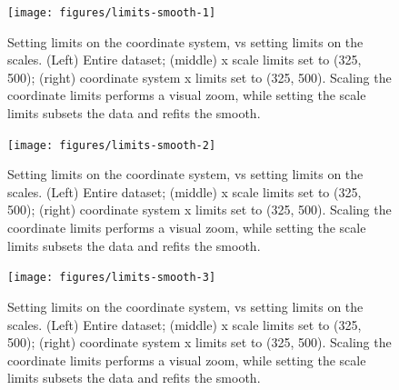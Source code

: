 \begin{figure}
\texttt{[image: figures/limits-smooth-1]} \caption{Setting limits on the coordinate system, vs setting limits on the scales.  (Left) Entire dataset; (middle) x scale limits set to (325, 500); (right) coordinate system x limits set to (325, 500).  Scaling the coordinate limits performs a visual zoom, while setting the scale limits subsets the data and refits the smooth.\label{fig:limits-smooth1}}
\end{figure}

\begin{Shaded}
\begin{Highlighting}[]
\StringTok{ }\NormalTok{(} \NormalTok{(}\NormalTok{, }\NormalTok{))}
\end{Highlighting}
\end{Shaded}

\begin{figure}
\texttt{[image: figures/limits-smooth-2]} \caption{Setting limits on the coordinate system, vs setting limits on the scales.  (Left) Entire dataset; (middle) x scale limits set to (325, 500); (right) coordinate system x limits set to (325, 500).  Scaling the coordinate limits performs a visual zoom, while setting the scale limits subsets the data and refits the smooth.\label{fig:limits-smooth2}}
\end{figure}

\begin{Shaded}
\begin{Highlighting}[]
\StringTok{ }\NormalTok{(} \NormalTok{(}\NormalTok{, }\NormalTok{))}
\end{Highlighting}
\end{Shaded}

\begin{figure}
\texttt{[image: figures/limits-smooth-3]} \caption{Setting limits on the coordinate system, vs setting limits on the scales.  (Left) Entire dataset; (middle) x scale limits set to (325, 500); (right) coordinate system x limits set to (325, 500).  Scaling the coordinate limits performs a visual zoom, while setting the scale limits subsets the data and refits the smooth.\label{fig:limits-smooth3}}
\end{figure}

